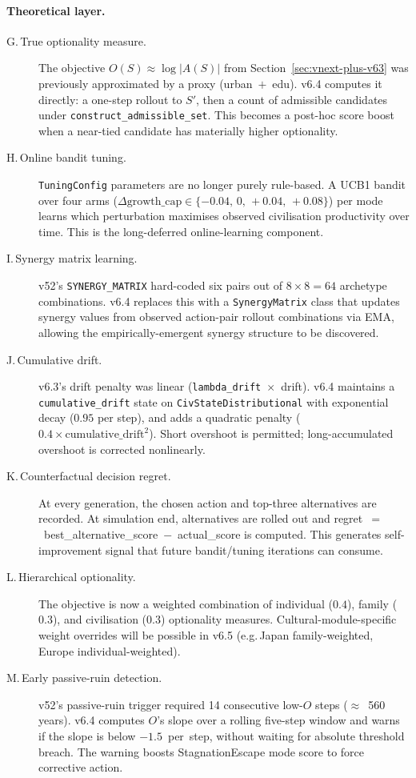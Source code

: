 \paragraph{Theoretical layer.}
\begin{description}
\item[G.\,True optionality measure.]
The objective $O(S) \approx \log |A(S)|$ from
Section~\ref{sec:vnext-plus-v63} was previously approximated by a
proxy (urban~$+$~edu). v6.4 computes it directly: a one-step rollout
to $S'$, then a count of admissible candidates under
\texttt{construct\_admissible\_set}. This becomes a post-hoc score
boost when a near-tied candidate has materially higher optionality.

\item[H.\,Online bandit tuning.]
\texttt{TuningConfig} parameters are no longer purely rule-based.
A UCB1 bandit over four arms ($\Delta\mathrm{growth\_cap}
\in\{-0.04,\,0,\,+0.04,\,+0.08\}$) per mode learns which
perturbation maximises observed civilisation productivity over time.
This is the long-deferred online-learning component.

\item[I.\,Synergy matrix learning.]
v52's \texttt{SYNERGY\_MATRIX} hard-coded six pairs out of
$8 \times 8 = 64$ archetype combinations. v6.4 replaces this with a
\texttt{SynergyMatrix} class that updates synergy values from
observed action-pair rollout combinations via EMA, allowing the
empirically-emergent synergy structure to be discovered.

\item[J.\,Cumulative drift.]
v6.3's drift penalty was linear (\texttt{lambda\_drift}~$\times$~drift).
v6.4 maintains a \texttt{cumulative\_drift} state on
\texttt{CivStateDistributional} with exponential decay
($0.95$ per step), and adds a quadratic penalty
($0.4 \times \mathrm{cumulative\_drift}^2$). Short overshoot is
permitted; long-accumulated overshoot is corrected nonlinearly.

\item[K.\,Counterfactual decision regret.]
At every generation, the chosen action and top-three alternatives
are recorded. At simulation end, alternatives are rolled out and
regret~$=$~best\_alternative\_score~$-$~actual\_score is computed.
This generates self-improvement signal that future bandit/tuning
iterations can consume.

\item[L.\,Hierarchical optionality.]
The objective is now a weighted combination of individual ($0.4$),
family ($0.3$), and civilisation ($0.3$) optionality measures.
Cultural-module-specific weight overrides will be possible in
v6.5 (e.g.\,Japan family-weighted, Europe individual-weighted).

\item[M.\,Early passive-ruin detection.]
v52's passive-ruin trigger required 14 consecutive low-$O$ steps
($\approx$~560 years). v6.4 computes $O$'s slope over a rolling
five-step window and warns if the slope is below $-1.5$~per~step,
without waiting for absolute threshold breach. The warning boosts
StagnationEscape mode score to force corrective action.
\end{description}

